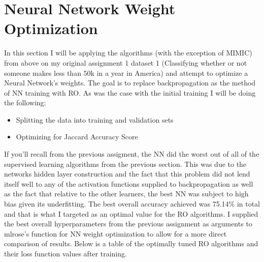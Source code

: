\documentclass[11pt]{article}
\begin{document}
    \section{Neural Network Weight Optimization}
    In this section I will be applying the algorithms (with the exception of MIMIC) from above on my original assignment 1 dataset 1 (Classifying whether
    or not someone makes less than \textdollar50k in a year in America) and attempt to optimize a Neural Network's weights.
    The goal is to replace backpropagation as the method of NN training with RO\@.
    As was the case with the initial training I will be doing the following:
    \begin{itemize}
        \item Splitting the data into training and validation sets
        \item Optimizing for Jaccard Accuracy Score\cite{wikipedia_2021}
    \end{itemize}
    If you'll recall from the previous assigment, the NN did the worst out of all of the supervised learning algorithms from
    the previous section.
    This was due to the networks hidden layer construction and the fact that this problem did not lend itself well to any
    of the activation functions supplied to backpropagation as well as the fact that relative to the other learners, the
    best NN was subject to high bias given its underfitting.
    The best overall accuracy achieved was 75.14\% in total and that is what I targeted as an optimal value for the RO algorithms.
    I supplied the best overall hyperparameters from the previous assignment as arguments to mlrose's function for NN weight optimization
    to allow for a more direct comparison of results.
    Below is a table of the optimally tuned RO algorithms and their loss function values after training.
\end{document}
